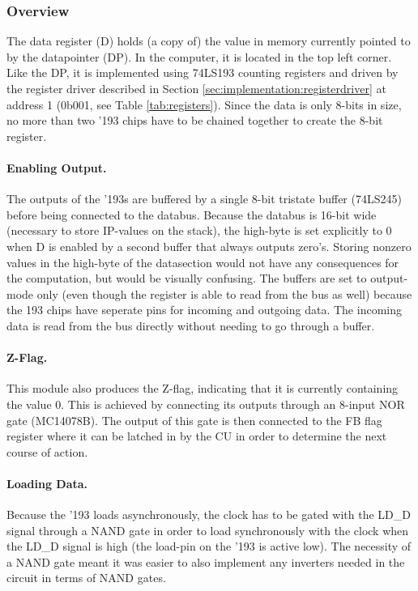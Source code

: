 \subsubsection{Overview}
The data register (D) holds (a copy of) the value in memory currently pointed to by the datapointer (DP). In the computer, it is located in the top left corner. Like the DP, it is implemented using 74LS193 counting registers and driven by the register driver described in Section \ref{sec:implementation:registerdriver} at address 1 (0b001, see Table \ref{tab:registers}). Since the data is only 8-bits in size, no more than two '193 chips have to be chained together to create the 8-bit register. 

\paragraph{Enabling Output. } The outputs of the '193s are buffered by a single 8-bit tristate buffer (74LS245) before being connected to the databus. Because the databus is 16-bit wide (necessary to store IP-values on the stack), the high-byte is set explicitly to 0 when D is enabled by a second buffer that always outputs zero's. Storing nonzero values in the high-byte of the datasection would not have any consequences for the computation, but would be visually confusing. The buffers are set to output-mode only (even though the register is able to read from the bus as well) because the 193 chips have seperate pins for incoming and outgoing data. The incoming data is read from the bus directly without needing to go through a buffer.

\paragraph{Z-Flag.} This module also produces the Z-flag, indicating that it is currently containing the value 0. This is achieved by connecting its outputs through an 8-input NOR gate (MC14078B). The output of this gate is then connected to the FB flag register where it can be latched in by the CU in order to determine the next course of action.

\paragraph{Loading Data.} Because the '193 loads asynchronously, the clock has to be gated with the LD\_D signal through a NAND gate in order to load synchronously with the clock when the LD\_D signal is high (the load-pin on the '193 is active low). The necessity of a NAND gate meant it was easier to also implement any inverters needed in the circuit in terms of NAND gates.



